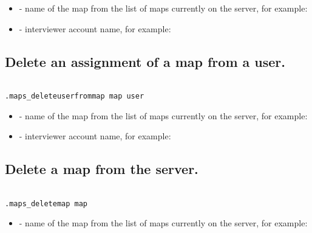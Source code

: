 \paramsheader
\begin{itemize}

  \item {} - name of the map from the list of maps
        currently on the server, for example: \newline

  \item {} - interviewer account name, for example: \newline

\end{itemize}


\subsection{Delete an assignment of a map from a user.}
\begin{lstlisting}[style=CommandLineStyle, showlines=true]

.maps_deleteuserfrommap map user

\end{lstlisting}

\paramsheader
\begin{itemize}

  \item {} - name of the map from the list of maps currently on
        the server, for example: \newline

  \item {} - interviewer account name, for example: \newline

\end{itemize}


\subsection{Delete a map from the server.}
\begin{lstlisting}[style=CommandLineStyle, showlines=true]

.maps_deletemap map

\end{lstlisting}

\paramsheader
\begin{itemize}
  \item {} - name of the map from the list of maps currently on
  the server, for example: \newline
\end{itemize}
